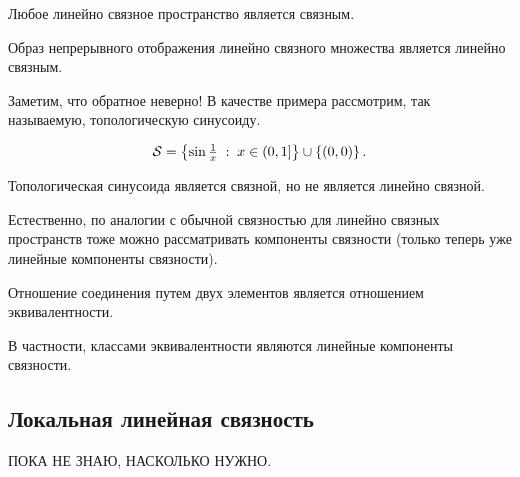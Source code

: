 \begin{Prop}
    Любое линейно связное пространство является связным.
\end{Prop}

\begin{Prop}
    Образ непрерывного отображения линейно связного множества является линейно связным.
\end{Prop}

\begin{Note}
    Заметим, что обратное неверно! В качестве примера рассмотрим, так называемую, топологическую синусоиду.

    \[
        \mathcal{S} = \left\{ \sin \tfrac1x \; : \; x \in (0, 1]  \right\} \cup \left\{ (0,0) \right\}.
    \] 
\end{Note}
\begin{Prop}
    Топологическая синусоида является связной, но не является линейно связной.
\end{Prop}

\begin{Note}
    Естественно, по аналогии с обычной связностью для линейно связных пространств тоже можно рассматривать компоненты связности (только теперь уже линейные компоненты связности). 
\end{Note}
 \begin{Prop}
   Отношение соединения путем двух элементов является отношением эквивалентности.

   В частности, классами эквивалентности являются линейные компоненты связности.
\end{Prop}

\subsection{Локальная линейная связность}
ПОКА НЕ ЗНАЮ, НАСКОЛЬКО НУЖНО.
